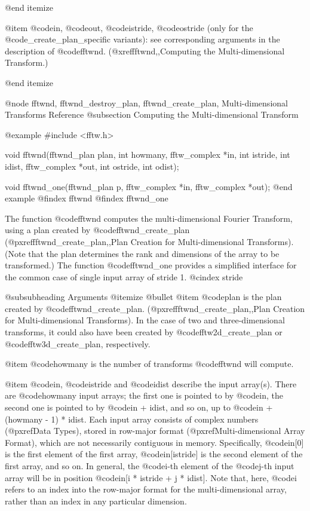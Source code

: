 @end itemize

@item
@code{in}, @code{out}, @code{istride}, @code{ostride} (only for the
@code{_create_plan_specific} variants): see corresponding arguments in
the description of @code{fftwnd}.  (@xref{fftwnd,,Computing the
Multi-dimensional Transform}.)

@end itemize

@node    fftwnd, fftwnd_destroy_plan, fftwnd_create_plan, Multi-dimensional Transforms Reference
@subsection Computing the Multi-dimensional Transform

@example
#include <fftw.h>

void fftwnd(fftwnd_plan plan, int howmany,
            fftw_complex *in, int istride, int idist,
            fftw_complex *out, int ostride, int odist);

void fftwnd_one(fftwnd_plan p, fftw_complex *in, 
                fftw_complex *out);
@end example
@findex fftwnd
@findex fftwnd_one

The function @code{fftwnd} computes the multi-dimensional Fourier
Transform, using a plan created by @code{fftwnd_create_plan}
(@pxref{fftwnd_create_plan,,Plan Creation for Multi-dimensional
Transforms}). (Note that the plan determines the rank and dimensions of
the array to be transformed.)  The function @code{fftwnd_one} provides a
simplified interface for the common case of single input array of stride
1.
@cindex stride

@subsubheading Arguments
@itemize @bullet
@item
@code{plan} is the plan created by @code{fftwnd_create_plan}.
(@pxref{fftwnd_create_plan,,Plan Creation for Multi-dimensional
Transforms}). In the case of two and three-dimensional transforms, it
could also have been created by @code{fftw2d_create_plan} or
@code{fftw3d_create_plan}, respectively.

@item
@code{howmany} is the number of transforms @code{fftwnd} will compute.

@item
@code{in}, @code{istride} and @code{idist} describe the input array(s).
There are @code{howmany} input arrays; the first one is pointed to by
@code{in}, the second one is pointed to by @code{in + idist}, and so on,
up to @code{in + (howmany - 1) * idist}.  Each input array consists of
complex numbers (@pxref{Data Types}), stored in row-major format
(@pxref{Multi-dimensional Array Format}), which are not necessarily
contiguous in memory.  Specifically, @code{in[0]} is the first element
of the first array, @code{in[istride]} is the second element of the
first array, and so on.  In general, the @code{i}-th element of the
@code{j}-th input array will be in position @code{in[i * istride + j *
idist]}. Note that, here, @code{i} refers to an index into the row-major
format for the multi-dimensional array, rather than an index in any
particular dimension.

